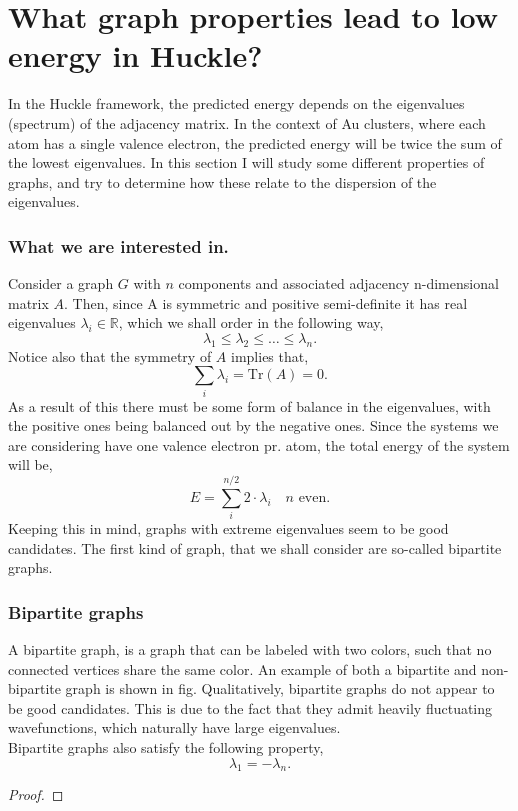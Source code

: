 \chapter{What graph properties lead to low energy in Huckle?}
In the Huckle framework, the predicted energy depends on the eigenvalues (spectrum) of the adjacency matrix. In the context of Au clusters, where each atom has a single valence electron, the predicted energy will be twice the sum of the lowest eigenvalues. In this section I will study some different properties of graphs, and try to determine how these relate to the dispersion of the eigenvalues. 
\subsection{What we are interested in.}
Consider a graph $G$ with $n$ components and associated adjacency n-dimensional matrix $A$. Then, since A is symmetric and positive semi-definite it has real eigenvalues $\lambda_i \in \mathbb{R}$, which we shall order in the following way,
\[
\lambda_1 \le  \lambda_2 \le \ldots \le \lambda_n
.\] 
Notice also that the symmetry of $A$ implies that,
 \[
\sum_i \lambda_i = \text{Tr}\left( A \right) = 0
.\] 
As a result of this there must be some form of balance in the eigenvalues, with the positive ones being balanced out by the negative ones. Since the systems we are considering have one valence electron pr. atom, the total energy of the system will be,
\[
E = \sum_{i}^{n /2} 2 \cdot \lambda_i \quad n \text{  even} 
.\] 
Keeping this in mind, graphs with extreme eigenvalues seem to be good candidates. The first kind of graph, that we shall consider are so-called bipartite graphs.
\subsection{Bipartite graphs}
A bipartite graph, is a graph that can be labeled with two colors, such that no connected vertices share the same color. An example of both a bipartite and non-bipartite graph is shown in fig. Qualitatively, bipartite graphs do not appear to be good candidates. This is due to the fact that they admit heavily fluctuating wavefunctions, which naturally have large eigenvalues.\\
Bipartite graphs also satisfy the following property,
\[
\lambda_1 = -\lambda_n
.\] 
\begin{proof}
    
\end{proof}
%

